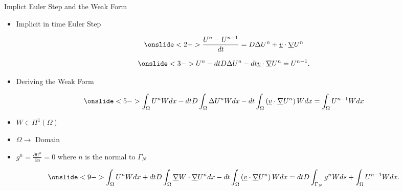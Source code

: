 \documentclass[10pt]{beamer}
\begin{document}
\begin{frame}{Implict Euler Step and the Weak Form}  \label{EulerandWeak}

\begin{itemize}
\item<1-> Implicit in time Euler Step
\end{itemize}
\footnotesize
\begin{equation}\onslide<2->
\frac{U^{n}-U^{n-1}}{dt}=D\Delta U^{n}+\underline{v} \cdot \underline{\nabla}U^{n}
\end{equation}

\begin{equation} \onslide<3->
U^{n}-dtD\Delta U^{n}-dt\underline{v}\cdot \underline{\nabla}U^{n}=U^{n-1}.
\end{equation}
\normalsize
\begin{itemize}
\item<4-> Deriving the Weak Form
\end{itemize}
\footnotesize
\begin{equation}\onslide<5->
\int_{\Omega}U^{n}W dx -dtD \int_{\Omega}\Delta U^{n}W dx-dt\int_{\Omega}\left(\underline{v}\cdot \underline{\nabla}U^{n}\right)W dx=\int_{\Omega} U^{n-1}W dx
\end{equation}

\begin{itemize}
\item<6-> $W \in H^{1}\left({\Omega}\right)$
\item<7-> $\Omega \rightarrow$ Domain
\item<8-> $g^{n}=\frac{\partial U^{n}}{\partial n}=0$ where $n$ is the normal to $\Gamma_{N}$
\end{itemize}

\begin{equation}\onslide<9->
\int_{\Omega}U^{n}W dx +dtD\int_{\Omega}\underline{\nabla}W \cdot \underline{\nabla} U^{n} dx-dt\int_{\Omega}\left(\underline{v}\cdot \underline{\nabla}U^{n}\right)W dx=dtD\int_{\Gamma_{N}}g^{n}W ds+ \int_{\Omega} U^{n-1}W dx.
\end{equation}
\normalsize
{}
\hyperlink{Questions}{}
\end{frame}
\end{document}

